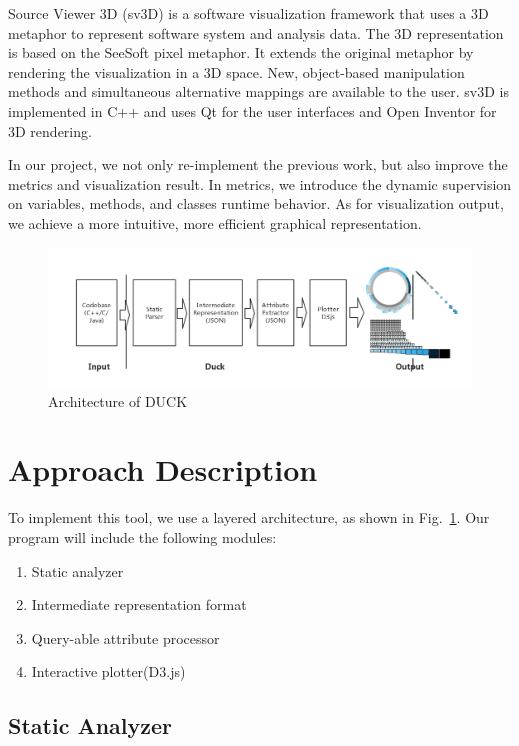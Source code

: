 \documentclass{sig-alternate}
\begin{document}
Source Viewer 3D (sv3D) is a software visualization framework that uses a 3D metaphor to represent software system and analysis data. The 3D representation is based on the SeeSoft pixel metaphor. It extends the original metaphor by rendering the visualization in a 3D space. New, object-based manipulation methods and simultaneous alternative mappings are available to the user. sv3D is implemented in C++ and uses Qt for the user interfaces and Open Inventor for 3D rendering. 

In our project, we not only re-implement the previous work, but also improve the metrics and visualization result.
In metrics, we introduce the dynamic supervision on variables, methods, and classes runtime behavior.
As for visualization output, we achieve a more intuitive, more efficient graphical representation.

\begin{figure}
\centering
\includegraphics[width=1.0\textwidth]{arch.png}
\caption{Architecture of DUCK}
\label{fig:arch}
\end{figure}

\section{Approach Description}
To implement this tool, we use a layered architecture, as shown in  Fig.~\ref{fig:arch}. Our program will include the following modules:
\vspace{-3pt}
\begin{enumerate}
\item Static analyzer
\vspace{-6pt}
\item Intermediate representation format
\vspace{-6pt}
\item Query-able attribute processor
\vspace{-6pt}
\item Interactive plotter(D3.js)
\end{enumerate}

\subsection{Static Analyzer}
\label{static}
\end{document}
